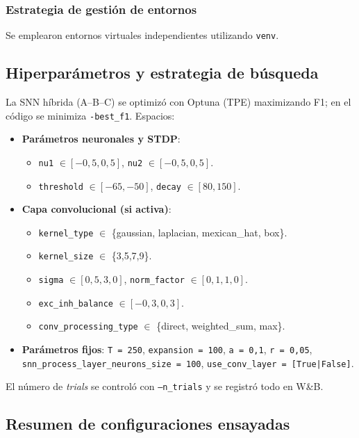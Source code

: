 \subsubsection*{Estrategia de gestión de entornos}
Se emplearon entornos virtuales independientes utilizando \texttt{venv}. 

\subsection{Hiperparámetros y estrategia de búsqueda}
La SNN híbrida (A--B--C) se optimizó con Optuna (TPE) maximizando F1; en el código se minimiza \texttt{-best\_f1}. Espacios:
\begin{itemize}
    \item \textbf{Parámetros neuronales y STDP}:
    \begin{itemize}
        \item \texttt{nu1} \(\in [-0{,}5, 0{,}5]\), \texttt{nu2} \(\in [-0{,}5, 0{,}5]\).
        \item \texttt{threshold} \(\in [-65, -50]\), \texttt{decay} \(\in [80, 150]\).
    \end{itemize}
    \item \textbf{Capa convolucional (si activa)}:
    \begin{itemize}
        \item \texttt{kernel\_type} \(\in\) \{gaussian, laplacian, mexican\_hat, box\}.
        \item \texttt{kernel\_size} \(\in\) \{3,5,7,9\}.
        \item \texttt{sigma} \(\in [0{,}5, 3{,}0]\), \texttt{norm\_factor} \(\in [0{,}1, 1{,}0]\).
        \item \texttt{exc\_inh\_balance} \(\in [-0{,}3, 0{,}3]\).
        \item \texttt{conv\_processing\_type} \(\in\) \{direct, weighted\_sum, max\}.
    \end{itemize}
    \item \textbf{Parámetros fijos}: \texttt{T = 250}, \texttt{expansion = 100}, \texttt{a = 0{,}1}, \texttt{r = 0{,}05}, \texttt{snn\_process\_layer\_neurons\_size = 100}, \texttt{use\_conv\_layer = [True|False]}.
\end{itemize}
El número de \textit{trials} se controló con \texttt{--n\_trials} y se registró todo en W\&B.

\subsection{Resumen de configuraciones ensayadas}

